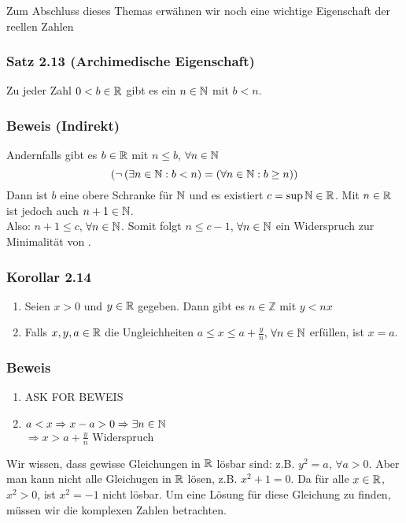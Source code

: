 Zum Abschluss dieses Themas erwähnen wir noch eine wichtige Eigenschaft der reellen Zahlen

\subsubsection*{Satz 2.13 (Archimedische Eigenschaft)}
Zu jeder Zahl $0<b\in\mathbb{R}$ gibt es ein $n\in\mathbb{N}$ mit $b<n$.
\subsubsection*{Beweis (Indirekt)}
Andernfalls gibt es $b\in\mathbb{R}$ mit $n\leq b$, $\forall n\in\mathbb{N}$ \[\left( \lnot\left(\exists n\in\mathbb{N}:b<n\right)=\left(\forall n\in\mathbb{N}:b\geq n\right)\right)\]
Dann ist $b$ eine obere Schranke für $\mathbb{N}$ und es existiert $c=\sup\mathbb{N}\in\mathbb{R}$. Mit $n\in\mathbb{R}$ ist jedoch auch $n+1\in\mathbb{N}$.\\
Also: $n+1\leq c$, $\forall n\in\mathbb{N}$. Somit folgt $n\leq c-1$, $\forall n\in\mathbb{N}$ ein Widerspruch zur Minimalität von .

\subsubsection*{Korollar 2.14}
\begin{enumerate}
    \item Seien $x>0$ und $y\in\mathbb{R}$ gegeben. Dann gibt es $n\in\mathbb{Z}$ mit $y<nx$
    \item Falls $x,y,a\in\mathbb{R}$ die Ungleichheiten $a\leq x\leq a+\frac{y}{n}$, $\forall n\in\mathbb{N}$ erfüllen, ist $x=a$.
\end{enumerate}
\subsubsection*{Beweis}

\begin{enumerate}
    \item ASK FOR BEWEIS
    \item $a<x\Rightarrow x-a>0\Rightarrow \exists n\in\mathbb{N}$\\
$\Rightarrow x>a+\frac{y}{n}$ Widerspruch
\end{enumerate}
Wir wissen, dass gewisse Gleichungen in $\mathbb{R}$ lösbar sind: z.B. $y^2=a$, $\forall a>0$. Aber man kann nicht alle Gleichugen in $\mathbb{R}$ lösen, z.B. $x^2+1=0$. Da für alle $x\in\mathbb{R}$, $x^2>0$, ist $x^2=-1$ nicht lösbar. Um eine Lösung für diese Gleichung zu finden, müssen wir die komplexen Zahlen betrachten.\\

